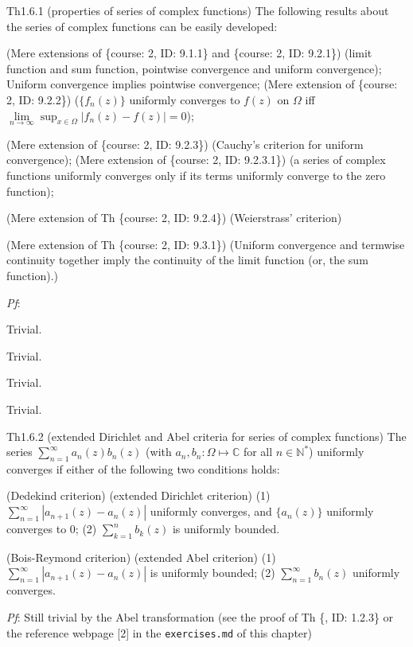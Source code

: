 \documentclass{article}
\begin{document}
\begin{Th}{Th1.6.1 (properties of series of complex functions)}
    The following results about the series of complex functions can be easily developed:
    \begin{compactenum}
        \item \textcolor{Df}{(Mere extensions of \{course: 2, ID: 9.1.1\} and \{course: 2, ID: 9.2.1\}) (limit function and sum function, pointwise convergence and uniform convergence)}; Uniform convergence implies pointwise convergence; (Mere extension of \{course: 2, ID: 9.2.2\}) ($\{f_n(z)\}$ uniformly converges to $f(z)$ on $\varOmega$ iff $ \lim\limits_{n\to\infty} \sup_{x\in\varOmega} |f_n(z) - f(z)| = 0 $);
        \item (Mere extension of \{course: 2, ID: 9.2.3\}) (Cauchy's criterion for uniform convergence); (Mere extension of \{course: 2, ID: 9.2.3.1\}) (a series of complex functions uniformly converges only if its terms uniformly converge to the zero function);
        \item (Mere extension of Th \{course: 2, ID: 9.2.4\}) (Weierstrass' criterion)
        \item (Mere extension of Th \{course: 2, ID: 9.3.1\}) (Uniform convergence and termwise continuity together imply the continuity of the limit function (or, the sum function).)
    \end{compactenum}
    \tcblower
    \textit{Pf}:
    \begin{compactenum}
        \item Trivial.
        \item Trivial.
        \item Trivial.
        \item Trivial.
    \end{compactenum}
\end{Th}

\begin{Th}{Th1.6.2 (extended Dirichlet and Abel criteria for series of complex functions)}
    The series $\sum_{n=1}^{\infty} a_n(z) b_n(z)$ (with $a_n, b_n: \varOmega\mapsto\mathbb{C}$ for all $n\in\mathbb{N}^\ast$) uniformly converges if either of the following two conditions holds:
    \begin{compactenum}
        \item (Dedekind criterion) (extended Dirichlet criterion) 
            \subitem (1) $\sum_{n=1}^{\infty} \left|a_{n+1}(z)-a_n(z)\right|$ uniformly converges, and $\{a_n(z)\}$ uniformly converges to $0$;
            \subitem (2) $\sum_{k=1}^{n} b_k (z)$ is uniformly bounded.
        \item (Bois-Reymond criterion) (extended Abel criterion)
            \subitem (1) $\sum_{n=1}^{\infty} \left|a_{n+1}(z)-a_n(z)\right|$ is uniformly bounded;
            \subitem (2) $\sum_{n=1}^{\infty} b_n(z)$ uniformly converges.
    \end{compactenum}
    \tcblower
    \textit{Pf}: Still trivial by the Abel transformation (see the proof of Th \{, ID: 1.2.3\} or the reference webpage [2] in the \verb|exercises.md| of this chapter)
\end{Th}
\end{document}
